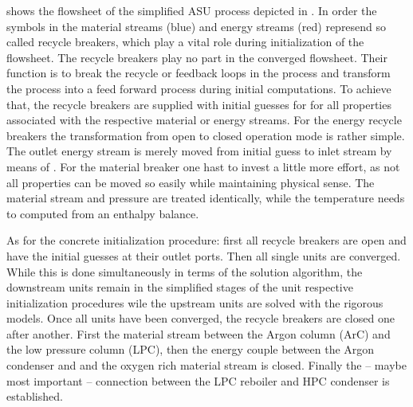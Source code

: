          shows the flowsheet of the simplified ASU process depicted in .
        In order the symbols in the material streams (blue) and energy streams (red) represend so called recycle breakers, which
        play a vital role during initialization of the flowsheet. The recycle breakers play no part in the converged flowsheet.
        Their function is to break the recycle or feedback loops in the process and transform the process into a feed forward process
        during initial computations. To achieve that, the recycle breakers are supplied with initial guesses for for all properties
        associated with the respective material or energy streams. For the energy recycle breakers the transformation from open to
        closed operation mode is rather simple. The outlet energy stream is merely moved from initial guess to inlet stream by
        means of . For the material breaker one hast to invest a little more effort, as not all properties can be
        moved so easily while maintaining physical sense. The material stream and pressure are treated identically, while the temperature
        needs to computed from an enthalpy balance.

        As for the concrete initialization procedure: first all recycle breakers are open and have the initial guesses at their outlet
        ports. Then all single units are converged. While this is done simultaneously in terms of the solution algorithm, the downstream
        units remain in the simplified stages of the unit respective initialization procedures wile the upstream units are solved with the
        rigorous models. Once all units have been converged, the recycle breakers are closed one after another. First the material stream
        between the Argon column (ArC) and the low pressure column (LPC), then the energy couple between the Argon condenser and
        and the oxygen rich material stream is closed. Finally the -- maybe most important -- connection between the LPC reboiler
        and HPC condenser is established.

